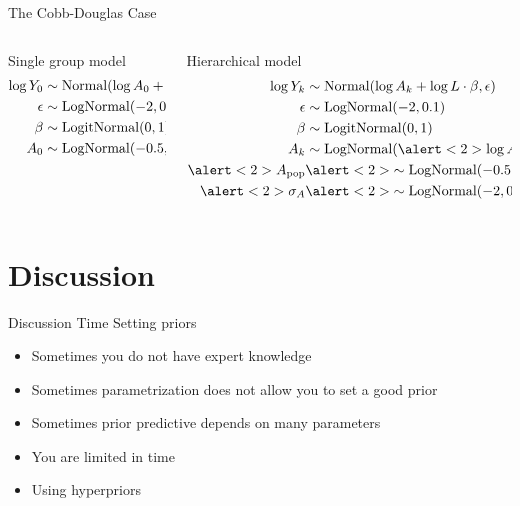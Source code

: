 \documentclass{beamer}
\begin{document}
\begin{frame}{The Cobb-Douglas Case}
    \begin{columns}[t]
    \begin{column}{0.5\linewidth}
    Single group model
     \begin{align*}
        \log Y_0 &\sim \operatorname{Normal}(\log A_0 + \log L \cdot \beta, {\epsilon})\\
        {\epsilon} &\sim \operatorname{LogNormal}(-2, 0.1)\\
        \beta &\sim \operatorname{LogitNormal}(0, 1)\\
        A_0 &\sim \operatorname{LogNormal}(-0.5, 0.1)\\
    \end{align*}
    \end{column}
    \begin{column}{0.5\linewidth}
    Hierarchical model
    \begin{align*}
        \log Y_k &\sim \operatorname{Normal}(\log A_k + \log L \cdot \beta, \eps)\\
        \eps &\sim \operatorname{LogNormal}(-2, 0.1)\\
        \beta &\sim \operatorname{LogitNormal}(0, 1)\\
        A_k &\sim \operatorname{LogNormal}(\alert<2>{\log A_{\text{pop}}}, \alert<2>{\sigma_A})\\
        \alert<2>{A_{\text{pop}}}&\alert<2>{\sim \operatorname{LogNormal}(-0.5, 0.1)}\\
        \alert<2>{\sigma_A}&\alert<2>{\sim \operatorname{LogNormal}(-2, 0.1)}
    \end{align*}
    \end{column}
    \end{columns}
\end{frame}
\section{Discussion}
\begin{frame}{Discussion Time}
Setting priors
    \begin{itemize}
        \item Sometimes you do not have expert knowledge
        \item Sometimes parametrization does not allow you to set a good prior
        \item Sometimes prior predictive depends on many parameters
        \item You are limited in time
        \item Using hyperpriors
    \end{itemize}
\end{frame}
\end{document}
